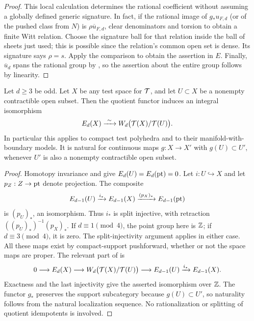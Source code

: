 \begin{proof}
This local calculation determines the rational coefficient
without assuming a globally defined generic signature.  In
fact, if the rational image of $g_*u_{F,d}$ (or of the pushed class
from $N$) is $\rho\overline{u}_{F,d}$, clear denominators and torsion to obtain a finite Witt
relation.  Choose the signature ball for that relation inside
the ball of sheets just used; this is possible since the
relation's common open set is dense.  Its signature says
$\rho=s$.  Apply the comparison to obtain the assertion in $E$.
Finally, $\overline{u}_d$ spans the rational group by ,
so the assertion about the entire group follows by linearity.
\end{proof}

\begin{proposition}
\label{prop:contractible-quotient}
Let $d\geq3$ be odd. Let $X$ be any test space for $\mathcal T$, and let
$U\subset X$ be a
nonempty contractible open subset.  Then the quotient functor
induces an integral isomorphism
\begin{equation}
 \label{lat:contractible-isomorphism}
 E_d(X)\xrightarrow{\ \sim\ }
 W_d\bigl(\mathcal T(X)/\mathcal T(U)\bigr).
\end{equation}
In particular this applies to compact test polyhedra and to
their manifold-with-boundary models.  It is natural for
continuous maps $g:X\to X'$ with $g(U)\subset U'$, whenever
$U'$ is also a nonempty contractible open subset.
\end{proposition}

\begin{proof}
Homotopy invariance and  give
$E_d(U)=E_d(\mathrm{pt})=0$.  Let $i:U\hookrightarrow X$ and let
$p_Z:Z\to\mathrm{pt}$ denote projection.  The composite
\[
 E_{d-1}(U)\xrightarrow{i_*}E_{d-1}(X)
 \xrightarrow{(p_X)_*}E_{d-1}(\mathrm{pt})
\]
is $(p_U)_*$, an isomorphism.  Thus $i_*$ is split injective,
with retraction $((p_U)_*)^{-1}(p_X)_*$.  If $d\equiv1\pmod4$,
the point group here is $\mathbb Z$; if $d\equiv3\pmod4$, it is zero.
The split-injectivity argument applies in either case.
All these maps exist
by compact-support pushforward, whether or not the space maps
are proper.  The relevant part of  is
\[
 0\longrightarrow E_d(X)
 \longrightarrow W_d\bigl(\mathcal T(X)/\mathcal T(U)\bigr)
 \longrightarrow E_{d-1}(U)\xrightarrow{i_*}E_{d-1}(X).
\]
Exactness and the last injectivity give the asserted
isomorphism over $\mathbb Z$.  The functor $g_*$ preserves the support
subcategory because $g(U)\subset U'$, so naturality follows
from the natural localization sequence.  No rationalization
or splitting of quotient idempotents is involved.
\end{proof}
